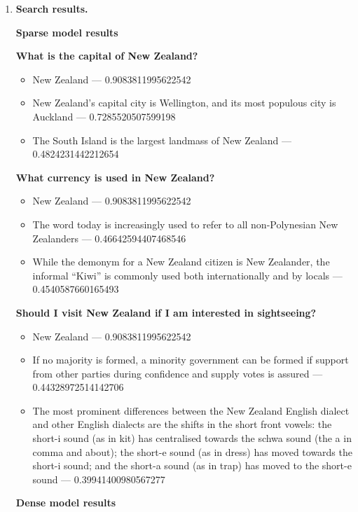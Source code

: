 \documentclass{article}
\begin{document}
\begin{enumerate}[leftmargin=1.6em,itemsep=6pt]
  \item \textbf{Search results.}

  \textbf{Sparse model results}

  \textbf{What is the capital of New Zealand?}
  \begin{itemize}
    \item New Zealand --- 0.9083811995622542
    \item New Zealand's capital city is Wellington, and its most populous city is Auckland ---
    0.7285520507599198
    \item The South Island is the largest landmass of New Zealand --- 0.4824231442212654
  \end{itemize}

  \textbf{What currency is used in New Zealand?}
  \begin{itemize}
    \item New Zealand --- 0.9083811995622542
    \item The word today is increasingly used to refer to all non-Polynesian New Zealanders ---
    0.46642594407468546
    \item While the demonym for a New Zealand citizen is New Zealander, the informal ``Kiwi''
    is commonly used both internationally and by locals --- 0.4540587660165493
  \end{itemize}

  \textbf{Should I visit New Zealand if I am interested in sightseeing?}
  \begin{itemize}
    \item New Zealand --- 0.9083811995622542
    \item If no majority is formed, a minority government can be formed if support from other
    parties during confidence and supply votes is assured --- 0.44328972514142706
    \item The most prominent differences between the New Zealand English dialect and other
    English dialects are the shifts in the short front vowels: the short-i sound (as in kit)
    has centralised towards the schwa sound (the a in comma and about); the short-e sound
    (as in dress) has moved towards the short-i sound; and the short-a sound (as in trap) has
    moved to the short-e sound --- 0.39941400980567277
  \end{itemize}

  \vspace{0.5cm}
  \textbf{Dense model results}


\end{enumerate}
\end{document}
